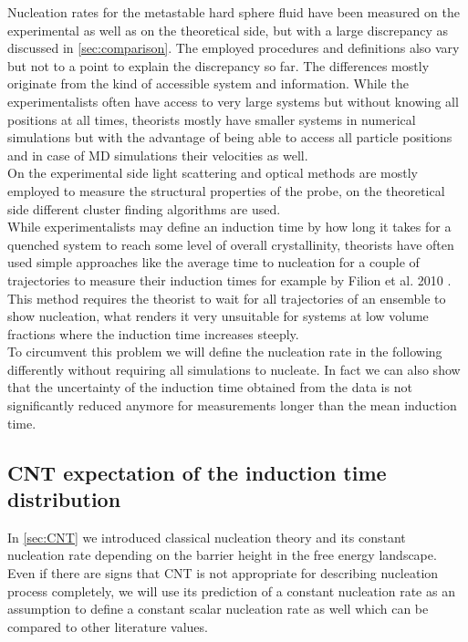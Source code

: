 Nucleation rates for the metastable hard sphere fluid have been measured on the experimental as well as on the theoretical side, but with a large discrepancy as discussed in \autoref{sec:comparison}. The employed procedures and definitions also vary but not to a point to explain the discrepancy so far. The differences mostly originate from the kind of accessible system and information. While the experimentalists often have access to very large systems but without knowing all positions at all times, theorists mostly have smaller systems in numerical simulations but with the advantage of being able to access all particle positions and in case of MD simulations their velocities as well.\\
On the experimental side light scattering and optical methods are mostly employed to measure the structural properties of the probe, on the theoretical side different cluster finding algorithms are used.\\
While experimentalists may define an induction time by how long it takes for a quenched system to reach some level of overall crystallinity, theorists have often used simple approaches like the average time to nucleation for a couple of trajectories to measure their induction times for example by Filion et al. 2010\cite{Filion2010a} . This method requires the theorist to wait for all trajectories of an ensemble to show nucleation, what renders it very unsuitable for systems at low volume fractions where the induction time increases steeply.\\

To circumvent this problem we will define the nucleation rate in the following differently without requiring all simulations to nucleate. In fact we can also show that the uncertainty of the induction time obtained from the data is not significantly reduced anymore for measurements longer than the mean induction time.

\subsection{CNT expectation of the induction time distribution}
\label{sec:induction_time_expectation}
In \autoref{sec:CNT} we introduced classical nucleation theory and its constant nucleation rate depending on the barrier height in the free energy landscape. Even if there are signs that CNT is not appropriate for describing nucleation process completely, we will use its prediction of a constant nucleation rate as an assumption to define a constant scalar nucleation rate as well which can be compared to other literature values.\\

